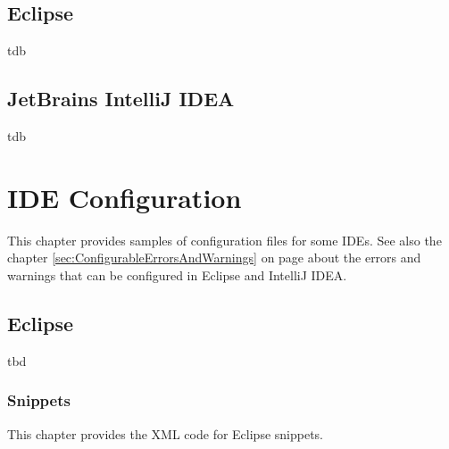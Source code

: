 \documentclass[11pt,a4paper, titlepage, parskip=half, headsepline, footsepline, cleardoublepage=current, headheight=1cm]{scrbook}
\newcommand*{\tqvref}[1]{\hyperref[{#1}]{\ref*{#1}} on page \pageref{#1}}
\begin{document}
\subsection{Eclipse}\label{sec:EclipseErrorsAndWarnings}
tdb

\subsection{JetBrains IntelliJ IDEA}\label{sec:IntelliJErrorsAndWarnings}
tdb

\section{IDE Configuration}\label{sec:IDEConfiguration}
This chapter provides samples of configuration files for some IDEs. See also the chapter \tqvref{sec:ConfigurableErrorsAndWarnings} about the errors and warnings that can be configured in Eclipse and IntelliJ IDEA.

\subsection{Eclipse}\label{sec:EclipseConfiguration}
tbd

\subsubsection{Snippets}
This chapter provides the XML code for Eclipse snippets.
\end{document}
